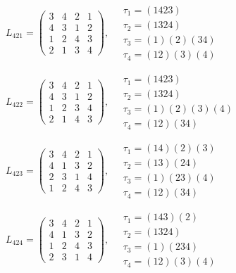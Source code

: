 $L_{421} = \begin{pmatrix} 3 & 4 & 2 & 1 \\ 4 & 3 & 1 & 2 \\ 1 & 2 & 4 & 3 \\ 2 & 1 & 3 & 4 \end{pmatrix}, \quad \begin{matrix} \tau_{1} = (1 4 2 3) \\ \tau_{2} = (1 3 2 4) \\ \tau_{3} = (1)(2)(3 4) \\ \tau_{4} = (1 2)(3)(4) \end{matrix}$

$L_{422} = \begin{pmatrix} 3 & 4 & 2 & 1 \\ 4 & 3 & 1 & 2 \\ 1 & 2 & 3 & 4 \\ 2 & 1 & 4 & 3 \end{pmatrix}, \quad \begin{matrix} \tau_{1} = (1 4 2 3) \\ \tau_{2} = (1 3 2 4) \\ \tau_{3} = (1)(2)(3)(4) \\ \tau_{4} = (1 2)(3 4) \end{matrix}$

$L_{423} = \begin{pmatrix} 3 & 4 & 2 & 1 \\ 4 & 1 & 3 & 2 \\ 2 & 3 & 1 & 4 \\ 1 & 2 & 4 & 3 \end{pmatrix}, \quad \begin{matrix} \tau_{1} = (1 4)(2)(3) \\ \tau_{2} = (1 3)(2 4) \\ \tau_{3} = (1)(2 3)(4) \\ \tau_{4} = (1 2)(3 4) \end{matrix}$

$L_{424} = \begin{pmatrix} 3 & 4 & 2 & 1 \\ 4 & 1 & 3 & 2 \\ 1 & 2 & 4 & 3 \\ 2 & 3 & 1 & 4 \end{pmatrix}, \quad \begin{matrix} \tau_{1} = (1 4 3)(2) \\ \tau_{2} = (1 3 2 4) \\ \tau_{3} = (1)(2 3 4) \\ \tau_{4} = (1 2)(3)(4) \end{matrix}$

